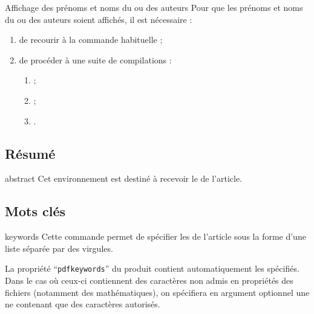 \documentclass[french,nolocaltoc]{nwejmart}
\newtheorem[title=Fait,style=definition]{fact}
\begin{document}
\begin{dbwarning}{Affichage des prénoms et noms du ou des auteurs}{}
  Pour que les prénoms et noms du ou des auteurs soient affichés, il est
  nécessaire :
  \begin{enumerate}
  \item de recourir à la commande habituelle  ;
  \item de procéder à une suite de compilations\suitecompilations{} :
    \begin{enumerate}
    \item {} ;
    \item {} ;
    \item {}.
    \end{enumerate}
  \end{enumerate}
\end{dbwarning}

\subsection{Résumé}
\label{sec-resume}

\begin{docEnvironment}[doc description=\mandatory,doclang/environment content=résumé]{abstract}{}
  Cet environnement est destiné à recevoir le  de l'article.
\end{docEnvironment}

\subsection{Mots clés}

\begin{docCommand}[doc description=\mandatory]{keywords}{}
  Cette commande permet de spécifier les  de l'article sous la
  forme d'une liste séparée par des virgules.

  La propriété \enquote{\texttt{pdfkeywords}} du  produit contient
  automatiquement les  spécifiés. Dans le cas où ceux-ci
  contiennent des caractères non admis en propriétés des fichiers 
  (notamment des mathématiques), on spécifiera en argument optionnel une
   ne contenant que des caractères autorisés.
\end{docCommand}

\begin{bodycode}[listing options={deletekeywords={[5]keywords}}]
\end{bodycode}
\end{document}
